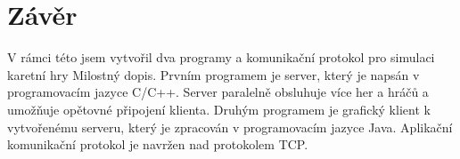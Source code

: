\documentclass[12pt, a4paper]{article}
\begin{document}
\newpage
\section{Závěr}  %
V rámci této jsem vytvořil dva programy a komunikační protokol pro simulaci karetní hry Milostný dopis. Prvním programem je server, který je napsán v programovacím jazyce C/C++. Server paralelně obsluhuje více her a hráčů a umožňuje opětovné připojení klienta. Druhým programem je grafický klient k vytvořenému serveru, který je zpracován v programovacím jazyce Java. Aplikační komunikační protokol je navržen nad protokolem TCP.
\end{document}
